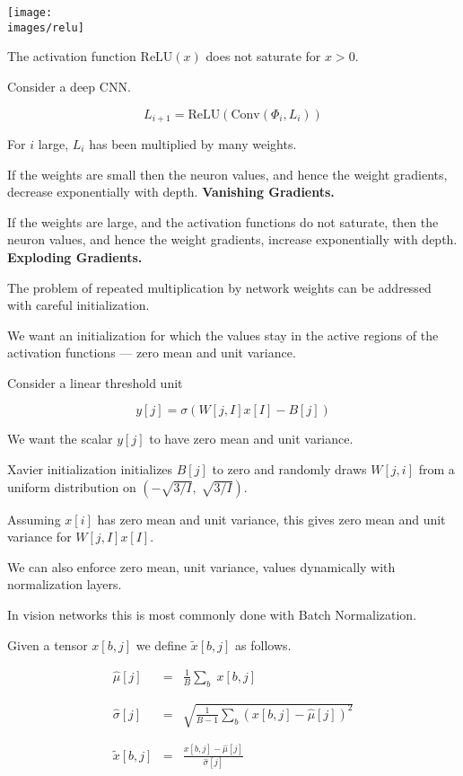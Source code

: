 {\vfill
\centerline{\texttt{[image: \\images/relu]}}

\vfill
The activation function $\mathrm{ReLU}(x)$ does not saturate for $x > 0$.


Consider a deep CNN.

$$L_{i+1} = \mathrm{ReLU}(\mathrm{Conv}(\Phi_i,L_i))$$

\vfill
For $i$ large, $L_i$ has been multiplied by many weights.

\vfill
If the weights are small then the neuron values, and hence the weight gradients, decrease exponentially with depth. {\bf Vanishing Gradients.}

\vfill
If the weights are large, and the activation functions do not saturate, then the neuron values, and hence the weight gradients,
increase exponentially with depth. {\bf Exploding Gradients.}


The problem of repeated multiplication by network weights can be addressed with careful initialization.

\vfill
We want an initialization for which the values stay in the active regions of the activation functions --- zero mean and unit variance.



Consider a linear threshold unit

\vfill
$$y[j] = \sigma(W[j,I]x[I] - B[j])$$

\vfill
We want the scalar $y[j]$ to have zero mean and unit variance.

\vfill
Xavier initialization initializes $B[j]$ to zero and randomly draws $W[j,i]$ from a uniform distribution on $\left(-\sqrt{3/I},\;\sqrt{3/I}\right)$.

\vfill
Assuming $x[i]$ has zero mean and unit variance, this gives zero mean and unit variance for $W[j,I]x[I]$.


We can also enforce zero mean, unit variance, values dynamically with normalization layers.

\vfill
In vision networks this is most commonly done with Batch Normalization.

Given a tensor $x[b,j]$ we define $\tilde{x}[b,j]$ as follows.

\begin{eqnarray*}
  \hat{\mu}[j] & = & \frac{1}{B} \sum_b\;x[b,j] \\
  \\
  \\
  \hat{\sigma}[j] & = & \sqrt{\frac{1}{B-1} \sum_b (x[b,j]-\hat{\mu}[j])^2} \\
  \\
  \\
  \tilde{x}[b,j]& = & \frac{x[b,j] - \hat{\mu}[j]}{\hat{\sigma}[j]}
\end{eqnarray*}


}

